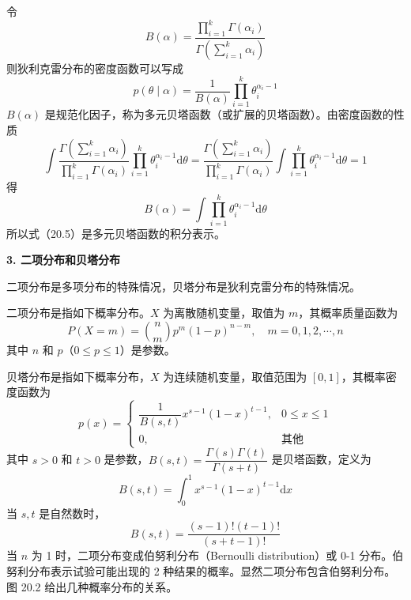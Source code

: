 \documentclass[UTF8, 12pt, fontset=fandol, oneside]{ctexart}
\begin{document}
令
\begin{equation}
B(\alpha)=\frac{\prod_{i=1}^k\Gamma(\alpha_i)}{\Gamma\left(\sum_{i=1}^k\alpha_i\right)}
\tag{20.3}
\end{equation}
则狄利克雷分布的密度函数可以写成
\begin{equation}
p(\theta\mid \alpha)=\frac{1}{B(\alpha)}\prod_{i=1}^k\theta_i^{\alpha_i-1}
\tag{20.4}
\end{equation}
$B(\alpha)$ 是规范化因子，称为多元贝塔函数（或扩展的贝塔函数）。由密度函数的性质
\[
\int \frac{\Gamma\left(\sum_{i=1}^k \alpha_i\right)}{\prod_{i=1}^k\Gamma(\alpha_i)}
\prod_{i=1}^k\theta_i^{\alpha_i-1}\mathrm{d}\theta
=\frac{\Gamma\left(\sum_{i=1}^k \alpha_i\right)}{\prod_{i=1}^k\Gamma(\alpha_i)}
\int \prod_{i=1}^k\theta_i^{\alpha_i-1}\mathrm{d}\theta=1
\]
得
\begin{equation}
B(\alpha)=\int \prod_{i=1}^k\theta_i^{\alpha_i-1}\mathrm{d}\theta
\tag{20.5}
\end{equation}
所以式（20.5）是多元贝塔函数的积分表示。

\noindent\textbf{3. 二项分布和贝塔分布}

二项分布是多项分布的特殊情况，贝塔分布是狄利克雷分布的特殊情况。

二项分布是指如下概率分布。$X$ 为离散随机变量，取值为 $m$，其概率质量函数为
\begin{equation}
P(X=m)=\binom{n}{m}p^m(1-p)^{n-m},\quad m=0,1,2,\cdots,n
\tag{20.6}
\end{equation}
其中 $n$ 和 $p$（$0\leq p\leq 1$）是参数。

贝塔分布是指如下概率分布，$X$ 为连续随机变量，取值范围为 $[0,1]$，其概率密度函数为
\begin{equation}
p(x)=
\begin{cases}
\dfrac{1}{B(s,t)}x^{s-1}(1-x)^{t-1}, & 0\leq x\leq 1\\
0, & \text{其他}
\end{cases}
\tag{20.7}
\end{equation}
其中 $s>0$ 和 $t>0$ 是参数，$B(s,t)=\dfrac{\Gamma(s)\Gamma(t)}{\Gamma(s+t)}$ 是贝塔函数，定义为
\begin{equation}
B(s,t)=\int_0^1 x^{s-1}(1-x)^{t-1}\mathrm{d}x
\tag{20.8}
\end{equation}
当 $s,t$ 是自然数时，
\begin{equation}
B(s,t)=\frac{(s-1)!(t-1)!}{(s+t-1)!}
\tag{20.9}
\end{equation}
当 $n$ 为 1 时，二项分布变成伯努利分布（Bernoulli distribution）或 0-1 分布。伯努利分布表示试验可能出现的 2 种结果的概率。显然二项分布包含伯努利分布。图 20.2 给出几种概率分布的关系。
\end{document}

